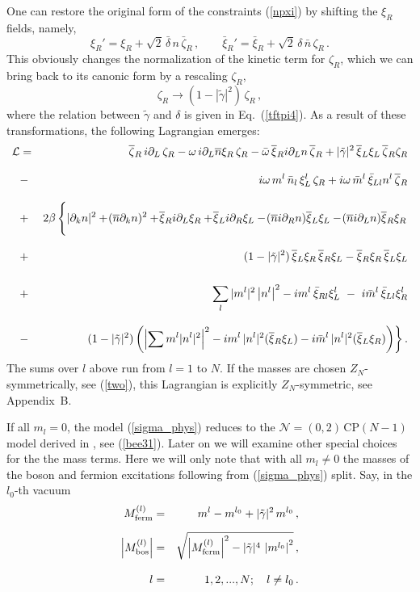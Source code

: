 \documentclass[epsfig,12pt]{article}
\def\beq{\begin{equation}}
\def\eeq{\end{equation}}
\def\beqn{\begin{eqnarray}}
\def\eeqn{\end{eqnarray}}
\newcommand{\nzt}{${\mathcal N}=(0,2)\,$}
\newcommand{\cpn}{CP$(N-1)\,$}
\newcommand{\cell}{{\mathcal L}}
\newcommand{\pt}{\partial}
\newcommand{\zn}{$Z_N$}
\def\beqn{\begin{eqnarray}}
\def\eeqn{\end{eqnarray}}
\def\beq{\begin{equation}}
\def\eeq{\end{equation}}
\newcommand{\p}{\partial}
\newcommand{\ov}{\overline}
\newcommand{\bxir}{\ov{\xi}{}_R}
\newcommand{\bxil}{\ov{\xi}{}_L}
\newcommand{\xir}{\xi_R}
\newcommand{\xil}{\xi_L}
\newcommand{\bzr}{\ov{\zeta}{}_R}
\newcommand{\zr}{\zeta_R}
\newcommand{\nbar}{\ov{n}}
\begin{document}
One can restore the original form of 
the constraints (\ref{npxi})  by   shifting  the $ \xir $ fields, namely,
\beq
\xi_R'= \xir + \sqrt{2}\, \bar{\delta}\, n\, \bar\zeta_R\,, \qquad
\bar\xi_R'= \bar\xi_R + \sqrt{2}\, {\delta}\, \bar{n}\, \zeta_R\,.
\label{wtpi7}
\eeq
This obviously changes the normalization of the kinetic term for $ \zr $, which we can
bring back to its canonic form by a rescaling $ \zr $,
\beq
	\zr  \to   ( 1 - |\tilde\gamma|^2 )\, \zr\,,
	\label{wtpi8}
\eeq
where the relation between $\tilde\gamma$ and $\delta$
is given in Eq.~(\ref{tftpi4}).
As a result of these transformations,  the following Lagrangian emerges:
\beqn
\cell 
&=&
 \bzr\, i\pt_L\, \zr
-\omega\, i\pt_L\nbar \xir\, \zr - \bar{\omega}\, \bxir i\p_L n\, \bzr
+ |\tilde\gamma|^2\, \bxil \xil\, \bzr \zr
	\nonumber\\[3mm]
	&-&
 i\omega\, m^l\, \bar{n}_l \, \xi_L^l\, \zr 
	+ i\omega\, \bar{m}^l\, \bar{\xi}_{Ll} n^l\, \bzr
\nonumber\\[3mm]
&+&
2\beta \left\{\rule{0mm}{6mm}
		| \pt_k n |^2  +\! (\nbar  \p_k n)^2 + \! \bxir i\p_L \xir +\! \bxil  i\p_R \xil
	-\!  (\nbar  i\p_R n)  \bxil \xil - \! (\nbar  i\p_L n) \bxir \xir
	\right.
\nonumber\\[3mm]
&+& (1-|\tilde\gamma|^2)\,\bxil\xir\,\bxir\xil - \bxir\xir\,\bxil\xil
	\nonumber\\[5mm]
&+&
  \sum_l |m^l|^2 \left|n^l \right|^2 
- i m^l\, \bar{\xi}_{Rl} \xi_L^l ~-~ i\bar{m}^l\, \bar{\xi}_{Ll} \xi_R^l
\nonumber\\[3mm]
&-&
\left.
 (1-|\tilde\gamma|^2)
	\left(
	 \left|\sum m^l |n^l|^2 \right|^2 
		- i m^l\, |n^l|^2 (\bxir\xil) - i\bar{m}^l\, |n^l|^2(\bxil\xir)
	\right) \right\}.
	\label{sigma_phys}
\eeqn
The sums over $l$ above run from $l=1$ to $N$. If the masses are chosen \zn-symmetrically, see
(\ref{two}), this Lagrangian is explicitly \zn-symmetric, see  Appendix~B.

If all $m_l=0$,  the model (\ref{sigma_phys}) reduces to the \nzt \cpn model
derived in \cite{SY1}, see (\ref{bee31}). 
Later on we will examine
other special choices for the  the mass terms. Here we will only note that
with all $m_l \neq 0$ the masses of the boson and fermion excitations following from
(\ref{sigma_phys}) split. Say, in the $l_0$-th vacuum
\beqn
M_{\rm ferm}^{(l)} 
&=&
 m^l - m^{l_0} + |\tilde\gamma|^2\,m^{l_0} \,,
	\nonumber\\[2mm]
	\left| M_{\rm bos}^{(l)} \right|
	&=&
	\sqrt{ \left| M^{(l)}_{\rm ferm} \right|^2 - |\tilde\gamma|^4\, \left| m^{l_0}\right|^2}
	\,,
	\nonumber\\[3mm]
	l
	&=&
	 1,2, ..., N;\quad l\neq l_0\,.
\eeqn
\end{document}
